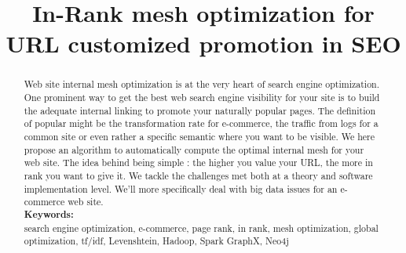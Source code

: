 \documentclass{iSWAGArticle}
\title{In-Rank mesh optimization for URL customized promotion in SEO}
\author{\iSWAGAuthor{Stefan Duprey\\
  Cdiscount\\
  stefan.duprey@cdiscount.com} \and \iSWAGAuthor{Fabien Jaunas\\
  Cdiscount\\
  fabien.jaunas@cdiscount.com}}
\begin{document}
  \maketitle
  \begin{abstract}
  Web site internal mesh optimization is at the very heart of search engine optimization. 
  One prominent way to get the best web search engine visibility for your site 
  is to build the adequate internal linking to promote your naturally popular pages. 
  The definition of popular might be the transformation rate for e-commerce, 
  the traffic from logs for a common site or even rather a specific semantic where you want to be visible. 
  We here propose an algorithm to automatically compute the optimal internal mesh for your web site. The idea
  behind being simple : the higher you value your URL, the more in rank you want to give it.
  We tackle the challenges met both at a theory and software implementation level. 
  We'll more specifically deal with big data issues for an e-commerce web site.
  \\\newline
  \indent \textbf{Keywords: }
  \\\newline
  search engine optimization, e-commerce, page rank, in rank, mesh optimization, global optimization, tf/idf, Levenshtein, Hadoop, Spark GraphX, Neo4j
  \end{abstract}
\end{document}
